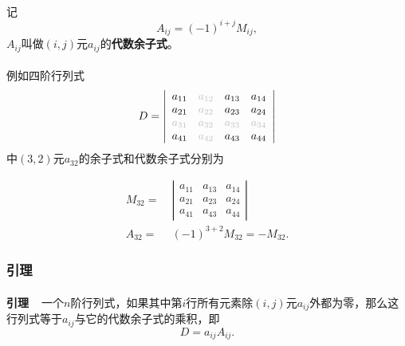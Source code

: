 \paragraph{}
记
\begin{equation*}
  A_{ij} = (-1)^{i+j}M_{ij},
\end{equation*}
$A_{ij}$叫做$(i,j)$元$a_{ij}$的\textbf{代数余子式}。

\paragraph{}
例如四阶行列式
\begin{equation*}
  D = \left|\begin{array}{cccc}
    a_{11} & \text{\color{gray!50}$a_{12}$} & a_{13} & a_{14} \\
    a_{21} & \text{\color{gray!50}$a_{22}$} & a_{23} & a_{24} \\
    \text{\color{gray!50}$a_{31}$} & \text{\color{gray!50}$a_{32}$} & \text{\color{gray!50}$a_{33}$} & \text{\color{gray!50}$a_{34}$} \\
    a_{41} & \text{\color{gray!50}$a_{42}$} & a_{43} & a_{44}
  \end{array} \right|
\end{equation*}
中$(3,2)$元$a_{32}$的余子式和代数余子式分别为

\begin{align*}
  M_{32} =&\; \left|\begin{array}{ccc}
    a_{11} & a_{13} & a_{14} \\
    a_{21} & a_{23} & a_{24} \\
    a_{41} & a_{43} & a_{44}
  \end{array} \right| \\
  A_{32} =&\; (-1)^{3+2}M_{32} = -M_{32}.
\end{align*}

\subsubsection{引理}
\paragraph{}
\textbf{引理~~}一个$n$阶行列式，如果其中第$i$行所有元素除$(i,j)$元$a_{ij}$外都为零，那么这行列式等于$a_{ij}$与它的代数余子式的乘积，即
\begin{equation*}
  D = a_{ij}A_{ij}.
\end{equation*}

